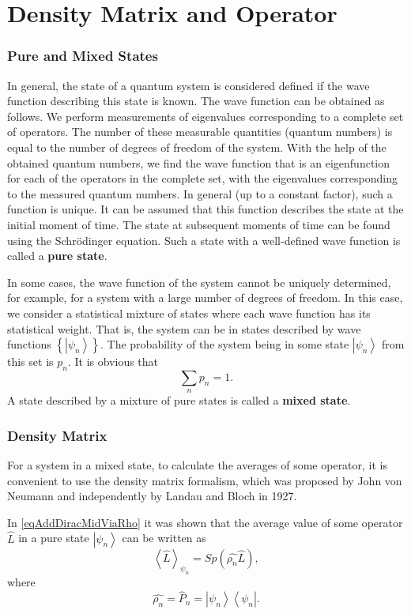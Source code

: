 \chapter{Density Matrix and Operator}
\label{AddState}

\subsection{Pure and Mixed States}
In general, the state of a quantum system is considered defined if the wave function describing this state is known. The wave function can be obtained as follows. We perform measurements of eigenvalues corresponding to a complete set of operators. The number of these measurable quantities (quantum numbers) is equal to the number of degrees of freedom of the system. With the help of the obtained quantum numbers, we find the wave function that is an eigenfunction for each of the operators in the complete set, with the eigenvalues corresponding to the measured quantum numbers. In general (up to a constant factor), such a function is unique. It can be assumed that this function describes the state at the initial moment of time. The state at subsequent moments of time can be found using the Schrödinger equation. Such a state with a well-defined wave function is called a \textbf{pure state}.

In some cases, the wave function of the system cannot be uniquely determined, for example, for a system with a large number of degrees of freedom. In this case, we consider a statistical mixture of states where each wave function has its statistical weight. That is, the system can be in states described by wave functions \(\left\{\left|\psi_n\right>\right\}\). The probability of the system being in some state \(\left|\psi_n\right>\) from this set is \(p_n\). It is obvious that
\[
\sum_n p_n = 1.
\]
A state described by a mixture of pure states is called a \textbf{mixed state}.

\subsection{Density Matrix}
For a system in a mixed state, to calculate the averages of some operator, it is convenient to use the density matrix formalism, which was proposed by John von Neumann and independently by Landau and Bloch in 1927.

In \ref{eqAddDiracMidViaRho} it was shown that the average value of some operator \(\hat{L}\) in a pure state \(\left|\psi_n\right>\) can be written as
\[
\left< \hat{L} \right>_{\psi_n} = Sp \left(\hat{\rho_n} \hat{L} \right),
\]
where
\[
\hat{\rho_n} = \hat{P}_n = \left|\psi_n\right>\left<\psi_n\right|.
\]

